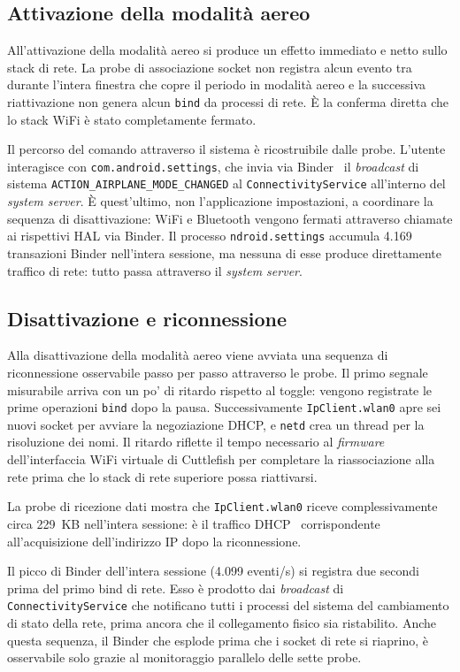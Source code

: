 \subsection{Attivazione della modalità aereo}

All'attivazione della modalità aereo si produce un effetto immediato e netto sullo stack di rete. La probe di associazione socket non registra alcun evento tra durante l'intera finestra che copre il periodo in modalità aereo e la successiva riattivazione non genera alcun \texttt{bind} da processi di rete. È la conferma diretta che lo stack WiFi è stato completamente fermato.

Il percorso del comando attraverso il sistema è ricostruibile dalle probe. L'utente interagisce con \texttt{com.android.settings}, che invia via Binder~\cite{binder_ipc} il \textit{broadcast} di sistema \texttt{ACTION\_AIRPLANE\_MODE\_CHANGED} al \texttt{ConnectivityService} all'interno del \textit{system server}. È quest'ultimo, non l'applicazione impostazioni, a coordinare la sequenza di disattivazione: WiFi e Bluetooth vengono fermati attraverso chiamate ai rispettivi HAL via Binder. Il processo \texttt{ndroid.settings} accumula 4.169 transazioni Binder nell'intera sessione, ma nessuna di esse produce direttamente traffico di rete: tutto passa attraverso il \textit{system server}.

\subsection{Disattivazione e riconnessione}

Alla disattivazione della modalità aereo viene avviata una sequenza di riconnessione osservabile passo per passo attraverso le probe. Il primo segnale misurabile arriva con un po' di ritardo rispetto al toggle: vengono registrate le prime operazioni \texttt{bind} dopo la pausa. Successivamente \texttt{IpClient.wlan0} apre sei nuovi socket per avviare la negoziazione DHCP, e \texttt{netd} crea un thread per la risoluzione dei nomi. Il ritardo riflette il tempo necessario al \textit{firmware} dell'interfaccia WiFi virtuale di Cuttlefish per completare la riassociazione alla rete prima che lo stack di rete superiore possa riattivarsi.

La probe di ricezione dati mostra che \texttt{IpClient.wlan0} riceve complessivamente circa 229~KB nell'intera sessione: è il traffico DHCP~\cite{dhcp_rfc} corrispondente all'acquisizione dell'indirizzo IP dopo la riconnessione.

Il picco di Binder dell'intera sessione (4.099 eventi/s) si registra due secondi prima del primo bind di rete. Esso è prodotto dai \textit{broadcast} di \texttt{ConnectivityService} che notificano tutti i processi del sistema del cambiamento di stato della rete, prima ancora che il collegamento fisico sia ristabilito. Anche questa sequenza, il Binder che esplode prima che i socket di rete si riaprino, è osservabile solo grazie al monitoraggio parallelo delle sette probe.

